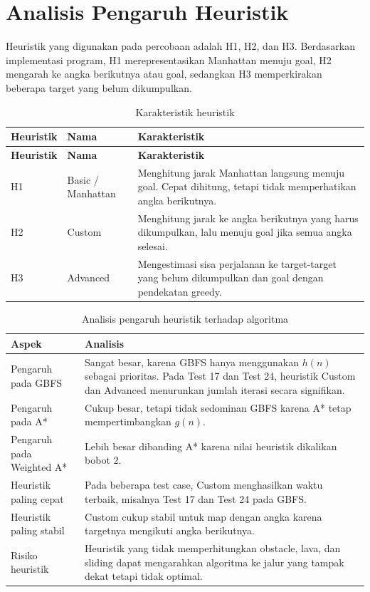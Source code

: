 \section{Analisis Pengaruh Heuristik}

Heuristik yang digunakan pada percobaan adalah H1, H2, dan H3. 
Berdasarkan implementasi program, H1 merepresentasikan Manhattan menuju goal, H2 mengarah ke angka berikutnya atau goal, sedangkan H3 memperkirakan beberapa target yang belum dikumpulkan.

\begin{longtable}{|p{2cm}|p{4cm}|p{7.5cm}|}
	\caption{Karakteristik heuristik} \\
	\hline
	\rowcolor{orange!20}
	\textbf{Heuristik} & \textbf{Nama} & \textbf{Karakteristik} \\
	\hline
	\endfirsthead
	
	\hline
	\rowcolor{orange!20}
	\textbf{Heuristik} & \textbf{Nama} & \textbf{Karakteristik} \\
	\hline
	\endhead
	
	H1 & Basic / Manhattan & Menghitung jarak Manhattan langsung menuju goal. Cepat dihitung, tetapi tidak memperhatikan angka berikutnya. \\
	\hline
	H2 & Custom & Menghitung jarak ke angka berikutnya yang harus dikumpulkan, lalu menuju goal jika semua angka selesai. \\
	\hline
	H3 & Advanced & Mengestimasi sisa perjalanan ke target-target yang belum dikumpulkan dan goal dengan pendekatan greedy. \\
	\hline
\end{longtable}

\begin{table}[H]
	\centering
	\caption{Analisis pengaruh heuristik terhadap algoritma}
	\begin{tabular}{|p{4cm}|p{10cm}|}
		\hline
		\rowcolor{orange!20}
		\textbf{Aspek} & \textbf{Analisis} \\
		\hline
		Pengaruh pada GBFS & Sangat besar, karena GBFS hanya menggunakan $h(n)$ sebagai prioritas. Pada Test 17 dan Test 24, heuristik Custom dan Advanced menurunkan jumlah iterasi secara signifikan. \\
		\hline
		Pengaruh pada A* & Cukup besar, tetapi tidak sedominan GBFS karena A* tetap mempertimbangkan $g(n)$. \\
		\hline
		Pengaruh pada Weighted A* & Lebih besar dibanding A* karena nilai heuristik dikalikan bobot $2$. \\
		\hline
		Heuristik paling cepat & Pada beberapa test case, Custom menghasilkan waktu terbaik, misalnya Test 17 dan Test 24 pada GBFS. \\
		\hline
		Heuristik paling stabil & Custom cukup stabil untuk map dengan angka karena targetnya mengikuti angka berikutnya. \\
		\hline
		Risiko heuristik & Heuristik yang tidak memperhitungkan obstacle, lava, dan sliding dapat mengarahkan algoritma ke jalur yang tampak dekat tetapi tidak optimal. \\
		\hline
	\end{tabular}
\end{table}


